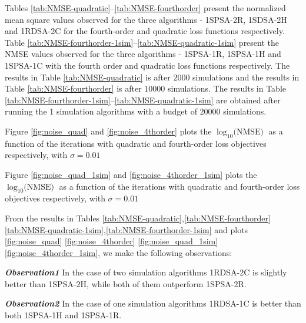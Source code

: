 Tables \ref{tab:NMSE-quadratic}--\ref{tab:NMSE-fourthorder} present the 
normalized mean square values observed for the three algorithms - 1SPSA-2R, 1SDSA-2H and 
1RDSA-2C for the fourth-order and quadratic loss functions respectively.
Table \ref{tab:NMSE-fourthorder-1sim}--\ref{tab:NMSE-quadratic-1sim} present 
the NMSE values observed for the three algorithms - 1SPSA-1R, 1SPSA-1H  and 1SPSA-1C
with the fourth order and quadratic loss functions respectively. 
The results  in Table \ref{tab:NMSE-quadratic} is after $2000$ simulations and
the results in Table \ref{tab:NMSE-fourthorder} is after $10000$ simulations.
The results in Table \ref{tab:NMSE-fourthorder-1sim}--\ref{tab:NMSE-quadratic-1sim} are 
obtained after running the 1 simulation algorithms with a budget of $20000$ simulations. 

Figure \ref{fig:noise_quad} and \ref{fig:noise_4thorder} plots the $\log_{10}\text{(NMSE)}$ as
a function of the iterations with quadratic and fourth-order loss objectives respectively,
with $\sigma=0.01$ 


Figure \ref{fig:noise_quad_1sim} and \ref{fig:noise_4thorder_1sim} plots the 
$\log_{10}\text{(NMSE)}$ as a function of the iterations with quadratic and fourth-order loss 
objectives respectively, with $\sigma=0.01$ 

From the results in Tables \ref{tab:NMSE-quadratic},\ref{tab:NMSE-fourthorder}
\ref{tab:NMSE-quadratic-1sim},\ref{tab:NMSE-fourthorder-1sim} and 
plots \ref{fig:noise_quad} \ref{fig:noise_4thorder} \ref{fig:noise_quad_1sim} 
\ref{fig:noise_4thorder_1sim}, we make the following observations:
 
\textit{\textbf{Observation1}} In the case of two simulation algorithms 1RDSA-2C is slightly better than 
1SPSA-2H, while both of them outperform 1SPSA-2R.

\textit{\textbf{Observation2}} In the case of one simulation algorithms 1RDSA-1C is better than both 
1SPSA-1H and 1SPSA-1R.

